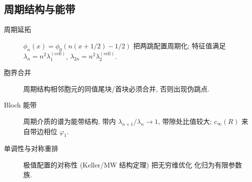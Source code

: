 \documentclass[UTF8]{ctexart}
\begin{document}
\subsection{周期结构与能带}

\begin{description}
	\item[周期延拓] $\phi_n(x) = \phi_0(n(x+1/2)-1/2)$ 把两跳配置周期化;
		特征值满足 $\lambda_n = n^2\lambda_1^{(\text{cell})}$, $\lambda_{2n} = n^2\lambda_2^{(\text{cell})}$.
	\item[胞界合并] 周期结构相邻胞元的同值尾块/首块必须合并, 否则出现伪跳点.
	\item[Bloch 能带] 周期介质的谱为能带结构, 带内 $\lambda_{n+1}/\lambda_n \to 1$,
		带隙处比值较大; $c_{\infty}(R)$ 来自带边相位 $\varphi_1$.
	\item[单调性与对称重排] 极值配置的对称性 (Keller/MW 结构定理) 把无穷维优化
		化归为有限参数族.
\end{description}
\end{document}
